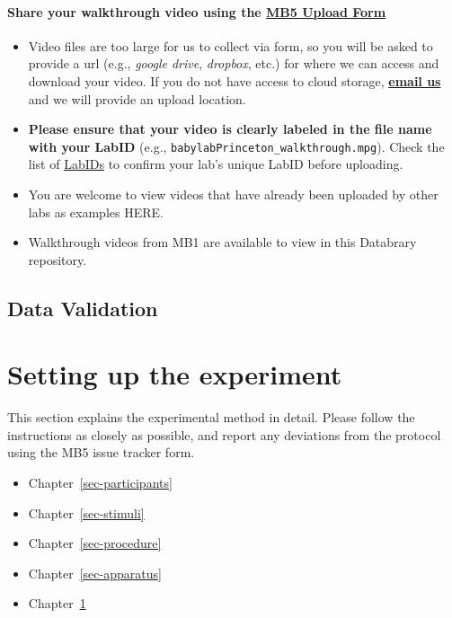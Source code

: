 \documentclass[
  letterpaper,
  DIV=11,
  numbers=noendperiod,
  oneside]{scrreprt}
\providecommand{\tightlist}{%
  \setlength{\itemsep}{0pt}\setlength{\parskip}{0pt}}
\begin{document}
\subsection{\texorpdfstring{Share your walkthrough video using the
\href{https://airtable.com/appRoqMKzcK3NsXt4/pagPm3MXnFExsz1Ti/form}{MB5
Upload
Form}}{Share your walkthrough video using the MB5 Upload Form}}\label{share-your-walkthrough-video-using-the}

\begin{itemize}
\tightlist
\item
  Video files are too large for us to collect via form, so you will be
  asked to provide a url (e.g., \emph{google drive}, \emph{dropbox},
  etc.) for where we can access and download your video. If you do not
  have access to cloud storage,
  \href{mailto:mb5@manybabies.org}{\textbf{email us}} and we will
  provide an upload location.
\item
  \textbf{Please ensure that your video is clearly labeled in the file
  name with your LabID} (e.g.,
  \texttt{babylabPrinceton\_walkthrough.mpg}). Check the list of
  \href{https://manybabies.org/labids/}{LabIDs} to confirm your lab's
  unique LabID before uploading.
\item
  You are welcome to view videos that have already been uploaded by
  other labs as examples HERE.
\item
  Walkthrough videos from MB1 are available to view in this Databrary
  repository.
\end{itemize}

\chapter{Data Validation}\label{sec-validation}

\part{Setting up the experiment}

This section explains the experimental method in detail. Please follow
the instructions as closely as possible, and report any deviations from
the protocol using the MB5 issue tracker form.

\begin{itemize}
\tightlist
\item
  Chapter~\ref{sec-participants}
\item
  Chapter~\ref{sec-stimuli}
\item
  Chapter~\ref{sec-procedure}
\item
  Chapter~\ref{sec-apparatus}
\item
  Chapter~\ref{sec-validation}
\end{itemize}
\end{document}
